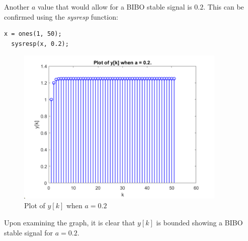 \documentclass[a4paper, 10pt]{article}
\begin{document}
\hfill

\noindent Another $a$ value that would allow for a BIBO stable signal is $0.2$. This can be confirmed using
the \textit{sysresp} function:
\begin{lstlisting}[style=Matlab-editor, basicstyle=\small\ttfamily]
  x = ones(1, 50);
  sysresp(x, 0.2);
\end{lstlisting}
\begin{figure}[H]
  \centering
  \includegraphics[width=10cm]{images/yk_graph_3.png}
  \caption{Plot of $y[k]$ when $a=0.2$}
\end{figure}
Upon examining the graph, it is clear that $y[k]$ is bounded showing a BIBO stable signal for $a=0.2$.
\end{document}
